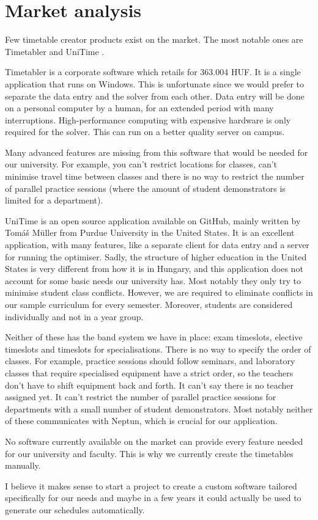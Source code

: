 \chapter{Market analysis}

Few timetable creator products exist on the market. The most notable ones are Timetabler \cite{Timetabler} and UniTime \cite{UniTime}.

Timetabler is a corporate software which retails for 363.004 HUF. It is a single application that runs on Windows. This is unfortunate since we would prefer to separate the data entry and the solver from each other. Data entry will be done on a personal computer by a human, for an extended period with many interruptions. High-performance computing with expensive hardware is only required for the solver. This can run on a better quality server on campus.

Many advanced features are missing from this software that would be needed for our university. For example, you can't restrict locations for classes, can't minimise travel time between classes and there is no way to restrict the number of parallel practice sessions (where the amount of student demonstrators is limited for a department).

UniTime is an open source application available on GitHub, mainly written by Tomáš Müller from Purdue University in the United States. It is an excellent application, with many features, like a separate client for data entry and a server for running the optimiser. Sadly, the structure of higher education in the United States is very different from how it is in Hungary, and this application does not account for some basic needs our university has. Most notably they only try to minimise student class conflicts. However, we are required to eliminate conflicts in our sample curriculum for every semester. Moreover, students are considered individually and not in a year group.

Neither of these has the band system we have in place: exam timeslots, elective timeslots and timeslots for specialisations. There is no way to specify the order of classes. For example, practice sessions should follow seminars, and laboratory classes that require specialised equipment have a strict order, so the teachers don't have to shift equipment back and forth. It can't say there is no teacher assigned yet. It can't restrict the number of parallel practice sessions for departments with a small number of student demonstrators. Most notably neither of these communicates with Neptun, which is crucial for our application.

No software currently available on the market can provide every feature needed for our university and faculty. This is why we currently create the timetables manually.

I believe it makes sense to start a project to create a custom software tailored specifically for our needs and maybe in a few years it could actually be used to generate our schedules automatically.


